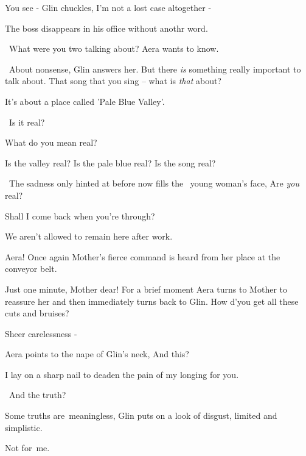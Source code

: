 \documentclass[letterpaper]{article}
\begin{document}
{{\textquotedbl}You see -{\textquotedbl} Glin chuckles, {\textquotedbl}I'm not a lost case altogether
-{\textquotedbl}}

{The boss disappears in his office without anothr word. }

{\ }{\textquotedbl}What were you two talking about?{\textquotedbl} Aera wants to know.

~{\textquotedbl}About nonsense,{\textquotedbl} Glin answers her. {\textquotedbl}But there \textit{is} something really
important to talk about. That song that you sing -- what is \textit{that} about?{\textquotedbl} 

{\textquotedbl}It's about a place called 'Pale Blue Valley'.{\textquotedbl}

~{\textquotedbl}Is it real?{\textquotedbl}

{\textquotedbl}What do you mean real?{\textquotedbl}

{\textquotedbl}Is the valley real? Is the pale blue real? Is the song real?{\textquotedbl}

~The sadness only hinted at before now fills the \ young woman's face, {\textquotedbl}Are \textit{you}
real?{\textquotedbl} 

{\textquotedbl}Shall I come back when you're through?{\textquotedbl}

{\textquotedbl}We aren't allowed to remain here after work.{\textquotedbl}

{\textquotedbl}Aera!{\textquotedbl} Once again Mother's fierce command is heard from her place at the conveyor belt.

{\textquotedbl}Just one minute, Mother dear!{\textquotedbl} For a brief moment\MakeUppercase{ a}era turns to Mother to
reassure her and then immediately turns back to Glin. {\textquotedbl}How d'you get all these cuts and
bruises?{\textquotedbl} 

{\textquotedbl}Sheer carelessness -{\textquotedbl}

Aera points to the nape of Glin's neck, {\textquotedbl}And this?{\textquotedbl}

{\textquotedbl}I lay on a sharp nail to deaden the pain of my longing for you.{\textquotedbl}

~{\textquotedbl}And the truth?{\textquotedbl} 

{\textquotedbl}Some truths are~meaningless,{\textquotedbl} Glin puts on a look of disgust, {\textquotedbl}limited and
simplistic.{\textquotedbl}

{\textquotedbl}Not for~me.{\textquotedbl}~ 
\end{document}

